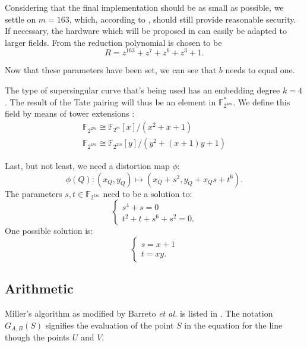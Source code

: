 Considering that the final implementation should be as small as possible, we settle on $m = 163$, which, according to \cite{lenstra}, should still provide reasonable security. If necessary, the hardware which will be proposed in  can easily be adapted to larger fields. From \cite{sec2} the reduction polynomial is chosen to be 
\begin{displaymath}
R = z^{163} + z^7 + z^6 + z^3 + 1.
\end{displaymath}

Now that these parameters have been set, we can see that $b$ needs to equal one.

The type of supersingular curve that's being used has an embedding degree $k = 4$. The result of the Tate pairing will thus be an element in $\mathbb{F}_{2^{4 m}}^*$. We define this field by means of tower extensions \cite{bertoni}:
\begin{displaymath}\begin{gathered}
\mathbb{F}_{2^{2 m}} \cong \mathbb{F}_{2^{m}}[x]/\left(x^2 + x + 1\right)\\
\mathbb{F}_{2^{4 m}} \cong \mathbb{F}_{2^{2 m}}[y]/\left(y^2 + (x + 1)y + 1\right)
\end{gathered}\end{displaymath}

Last, but not least, we need a distortion map $\phi$:
\begin{displaymath}
\phi(Q) : (x_Q, y_Q) \mapsto (x_Q + s^2, y_Q + x_Q s + t^6).
\end{displaymath}
The parameters $s, t \in \mathbb{F}_{2^{km}}$ need to be a solution to:
\begin{displaymath}\begin{cases}
s^4 + s = 0\\
t^2 + t + s^6 + s^2 = 0.
\end{cases}\end{displaymath}
One possible solution is:
\begin{displaymath}\begin{cases}
s = x + 1\\
t = xy.
\end{cases}\end{displaymath}


\subsection{Arithmetic}

Miller's algorithm as modified by Barreto \emph{et al.} is listed in . The notation $G_{A,B}(S)$ signifies the evaluation of the point $S$ in the equation for the line though the points $U$ and $V$.

